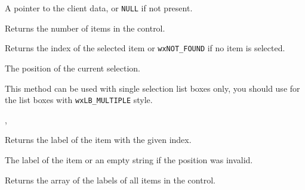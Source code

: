 

A pointer to the client data, or {\tt NULL} if not present.


\label{wxcontrolwithitemsgetcount}


Returns the number of items in the control.




\label{wxcontrolwithitemsgetselection}


Returns the index of the selected item or {\tt wxNOT\_FOUND} if no item is
selected.


The position of the current selection.


This method can be used with single selection list boxes only, you should use
 for the list boxes
with {\tt wxLB\_MULTIPLE} style.


,\rtfsp
{}


\label{wxcontrolwithitemsgetstring}


Returns the label of the item with the given index.




The label of the item or an empty string if the position was invalid.


\label{wxcontrolwithitemsgetstrings}


Returns the array of the labels of all items in the control.


